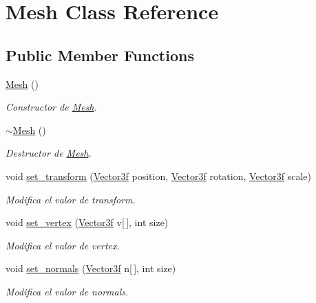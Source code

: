 \hypertarget{class_mesh}{}\section{Mesh Class Reference}
\label{class_mesh}
\subsection*{Public Member Functions}
\begin{DoxyCompactItemize}
\item 
\mbox{\hyperlink{class_mesh_a2af137f1571af89172b9c102302c416b}{Mesh}} ()
\begin{DoxyCompactList}\small\item\em Constructor de \mbox{\hyperlink{class_mesh}{Mesh}}. \end{DoxyCompactList}\item 
\mbox{\hyperlink{class_mesh_a5efe4da1a4c0971cfb037bd70304c303}{$\sim$\+Mesh}} ()
\begin{DoxyCompactList}\small\item\em Destructor de \mbox{\hyperlink{class_mesh}{Mesh}}. \end{DoxyCompactList}\item 
void \mbox{\hyperlink{class_mesh_acaa2c19720e250b7fa2cc39c4dc8380e}{set\+\_\+transform}} (\mbox{\hyperlink{structmathexp_1_1_vector3f}{Vector3f}} position, \mbox{\hyperlink{structmathexp_1_1_vector3f}{Vector3f}} rotation, \mbox{\hyperlink{structmathexp_1_1_vector3f}{Vector3f}} scale)
\begin{DoxyCompactList}\small\item\em Modifica el valor de transform. \end{DoxyCompactList}\item 
void \mbox{\hyperlink{class_mesh_a4f9777465484e8be22e6af6ec5d106f9}{set\+\_\+vertex}} (\mbox{\hyperlink{structmathexp_1_1_vector3f}{Vector3f}} v\mbox{[}$\,$\mbox{]}, int size)
\begin{DoxyCompactList}\small\item\em Modifica el valor de vertex. \end{DoxyCompactList}\item 
void \mbox{\hyperlink{class_mesh_a946e8b63ad2870c169364fc9399dcfaa}{set\+\_\+normals}} (\mbox{\hyperlink{structmathexp_1_1_vector3f}{Vector3f}} n\mbox{[}$\,$\mbox{]}, int size)
\begin{DoxyCompactList}\small\item\em Modifica el valor de normals. \end{DoxyCompactList}\item 

\end{DoxyCompactItemize}
